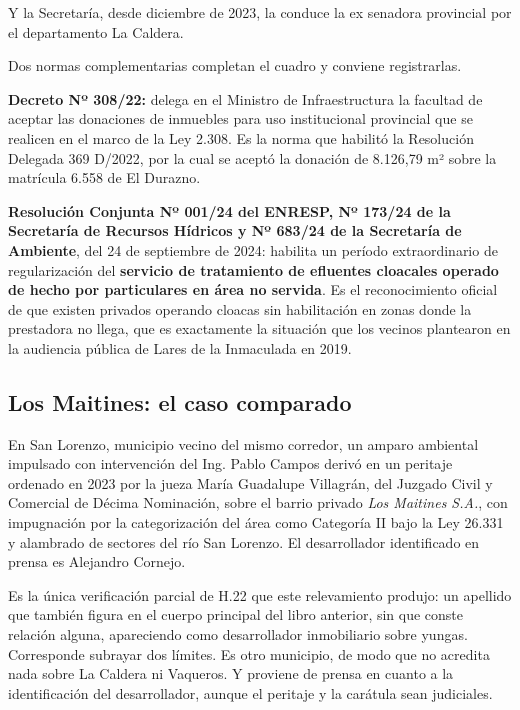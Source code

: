 Y la Secretaría, desde diciembre de 2023, la conduce la ex senadora provincial por el departamento La Caldera.

Dos normas complementarias completan el cuadro y conviene registrarlas.

\textbf{Decreto Nº 308/22:} delega en el Ministro de Infraestructura la facultad de aceptar las donaciones de inmuebles para uso institucional provincial que se realicen en el marco de la Ley 2.308. Es la norma que habilitó la Resolución Delegada 369 D/2022, por la cual se aceptó la donación de 8.126,79 m² sobre la matrícula 6.558 de El Durazno.

\textbf{Resolución Conjunta Nº 001/24 del ENRESP, Nº 173/24 de la Secretaría de Recursos Hídricos y Nº 683/24 de la Secretaría de Ambiente}, del 24 de septiembre de 2024: habilita un período extraordinario de regularización del \textbf{servicio de tratamiento de efluentes cloacales operado de hecho por particulares en área no servida}. Es el reconocimiento oficial de que existen privados operando cloacas sin habilitación en zonas donde la prestadora no llega, que es exactamente la situación que los vecinos plantearon en la audiencia pública de Lares de la Inmaculada en 2019.
\subsection*{Los Maitines: el caso comparado}

En San Lorenzo, municipio vecino del mismo corredor, un amparo ambiental impulsado con intervención del Ing. Pablo Campos derivó en un peritaje ordenado en 2023 por la jueza María Guadalupe Villagrán, del Juzgado Civil y Comercial de Décima Nominación, sobre el barrio privado \textit{Los Maitines S.A.}, con impugnación por la categorización del área como Categoría II bajo la Ley 26.331 y alambrado de sectores del río San Lorenzo. El desarrollador identificado en prensa es Alejandro Cornejo.

Es la única verificación parcial de H.22 que este relevamiento produjo: un apellido que también figura en el cuerpo principal del libro anterior, sin que conste relación alguna, apareciendo como desarrollador inmobiliario sobre yungas. Corresponde subrayar dos límites. Es otro municipio, de modo que no acredita nada sobre La Caldera ni Vaqueros. Y proviene de prensa en cuanto a la identificación del desarrollador, aunque el peritaje y la carátula sean judiciales.
